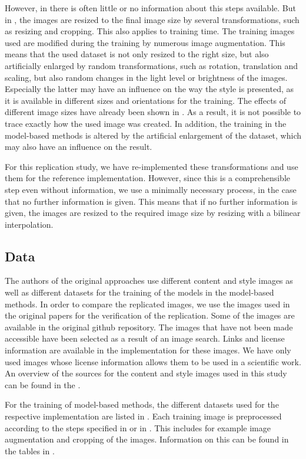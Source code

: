 However, in \paper{} there is often little or no information about this steps available. But in \implementation{}, the images are resized to the final image size by several transformations, such as resizing and cropping. This also applies to training time. The training images used are modified during the training by numerous image augmentation. This means that the used dataset is not only resized to the right size, but also artificially enlarged by random transformations, such as rotation, translation and scaling, but also random changes in the light level or brightness of the images. Especially the latter may have an influence on the way the style is presented, as it is available in different sizes and orientations for the training. The effects of different image sizes have already been shown in . As a result, it is not possible to trace exactly how the used image was created. In addition, the training in the model-based methods is altered by the artificial enlargement of the dataset, which may also have an influence on the result.

For this replication study, we have re-implemented these transformations and use them for the reference implementation. However, since this is a comprehensible step even without information, we use a minimally necessary process, in the case that no further information is given. This means that if no further information is given, the images are resized to the required image size by resizing with a bilinear interpolation.

\subsection{Data} \label{sec:data}
The authors of the original approaches use different content and style images as well as different datasets for the training of the models in the model-based methods. In order to compare the replicated images, we use the images used in the original papers for the verification of the replication. Some of the images are available in the original github repository. The images that have not been made accessible have been selected as a result of an image search. Links and license information are available in the implementation for these images. We have only used images whose license information allows them to be used in a scientific work. An overview of the sources for the content and style images used in this study can be found in the . 

For the training of model-based methods, the different datasets used for the respective implementation are listed in . Each training image is preprocessed according to the steps specified in \paper{} or in \implementation{}. This includes for example image augmentation and cropping of the images. Information on this can be found in the tables in .

